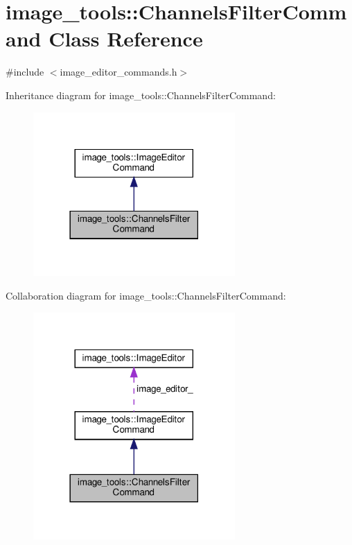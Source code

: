 \hypertarget{classimage__tools_1_1ChannelsFilterCommand}{}\section{image\+\_\+tools\+:\+:Channels\+Filter\+Command Class Reference}
\label{classimage__tools_1_1ChannelsFilterCommand}


{\ttfamily \#include $<$image\+\_\+editor\+\_\+commands.\+h$>$}



Inheritance diagram for image\+\_\+tools\+:\+:Channels\+Filter\+Command\+:
\nopagebreak
\begin{figure}[H]
\begin{center}
\leavevmode
\includegraphics[width=218pt]{classimage__tools_1_1ChannelsFilterCommand__inherit__graph}
\end{center}
\end{figure}


Collaboration diagram for image\+\_\+tools\+:\+:Channels\+Filter\+Command\+:
\nopagebreak
\begin{figure}[H]
\begin{center}
\leavevmode
\includegraphics[width=218pt]{classimage__tools_1_1ChannelsFilterCommand__coll__graph}
\end{center}
\end{figure}
